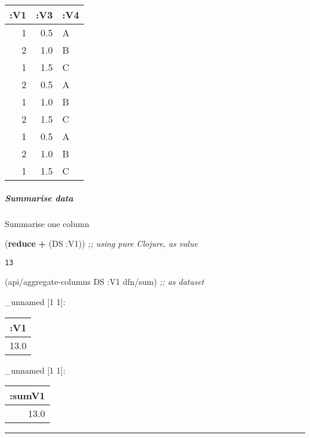 \documentclass[]{article}
\newenvironment{Shaded}{\begin{snugshade}}{\end{snugshade}}
\newcommand{\KeywordTok}[1]{\textcolor[rgb]{0.13,0.29,0.53}{\textbf{#1}}}
\newcommand{\CommentTok}[1]{\textcolor[rgb]{0.56,0.35,0.01}{\textit{#1}}}
\newcommand{\VariableTok}[1]{\textcolor[rgb]{0.00,0.00,0.00}{#1}}
\newcommand{\AttributeTok}[1]{\textcolor[rgb]{0.77,0.63,0.00}{#1}}
\newcommand{\NormalTok}[1]{#1}
\let\oldsubparagraph\subparagraph
\renewcommand{\subparagraph}[1]{\oldsubparagraph{#1}\mbox{}}
\begin{document}
\begin{longtable}[]{@{}rrl@{}}
\toprule
:V1 & :V3 & :V4\tabularnewline
\midrule
\endhead
1 & 0.5 & A\tabularnewline
2 & 1.0 & B\tabularnewline
1 & 1.5 & C\tabularnewline
2 & 0.5 & A\tabularnewline
1 & 1.0 & B\tabularnewline
2 & 1.5 & C\tabularnewline
1 & 0.5 & A\tabularnewline
2 & 1.0 & B\tabularnewline
1 & 1.5 & C\tabularnewline
\bottomrule
\end{longtable}

\subparagraph{Summarise data}\label{summarise-data}

Summarise one column

\begin{Shaded}
\begin{Highlighting}[]
\NormalTok{(}\KeywordTok{reduce} \KeywordTok{+}\NormalTok{ (DS }\AttributeTok{:V1}\NormalTok{)) }\CommentTok{;; using pure Clojure, as value}
\end{Highlighting}
\end{Shaded}

\begin{verbatim}
13
\end{verbatim}

\begin{Shaded}
\begin{Highlighting}[]
\NormalTok{(api/aggregate-columns DS }\AttributeTok{:V1}\NormalTok{ dfn/sum) }\CommentTok{;; as dataset}
\end{Highlighting}
\end{Shaded}

\_unnamed {[}1 1{]}:

\begin{longtable}[]{@{}r@{}}
\toprule
:V1\tabularnewline
\midrule
\endhead
13.0\tabularnewline
\bottomrule
\end{longtable}

\begin{Shaded}
\end{Shaded}

\_unnamed {[}1 1{]}:

\begin{longtable}[]{@{}r@{}}
\toprule
:sumV1\tabularnewline
\midrule
\endhead
13.0\tabularnewline
\bottomrule
\end{longtable}

\begin{center}\rule{0.5\linewidth}{0.5pt}\end{center}
\end{document}
